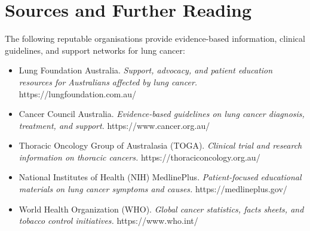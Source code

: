 \section*{Sources and Further Reading}
The following reputable organisations provide evidence-based information, clinical guidelines, and support networks for lung cancer:
\begin{itemize}
    \item Lung Foundation Australia. \textit{Support, advocacy, and patient education resources for Australians affected by lung cancer.} https://lungfoundation.com.au/
    \item Cancer Council Australia. \textit{Evidence-based guidelines on lung cancer diagnosis, treatment, and support.} https://www.cancer.org.au/
    \item Thoracic Oncology Group of Australasia (TOGA). \textit{Clinical trial and research information on thoracic cancers.} https://thoraciconcology.org.au/
    \item National Institutes of Health (NIH) MedlinePlus. \textit{Patient-focused educational materials on lung cancer symptoms and causes.} https://medlineplus.gov/
    \item World Health Organization (WHO). \textit{Global cancer statistics, facts sheets, and tobacco control initiatives.} https://www.who.int/
\end{itemize}
